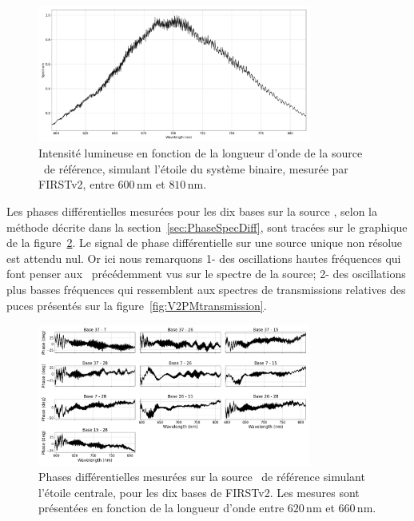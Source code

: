 \begin{figure}[ht!]
    \centering
    \includegraphics[width=0.8\textwidth]{Figure_Chap4/20221010_Bin01_Spectra_superK_Pola1_LaTex.png}
    \caption[Intensité lumineuse en fonction de la longueur d'onde de la source de référence (\sk) mesurée par FIRSTv2.]{Intensité lumineuse en fonction de la longueur d'onde de la source \sk~de référence, simulant l'étoile du système binaire, mesurée par FIRSTv2, entre $600 \,$nm et $810 \,$nm.}
    \label{fig:SuperKSpectrum}
\end{figure}

Les phases différentielles mesurées pour les dix bases sur la source \sk, selon la méthode décrite dans la section~\ref{sec:PhaseSpecDiff}, sont tracées sur le graphique de la figure~\ref{fig:PhaseDiffSuperK}. Le signal de phase différentielle sur une source unique non résolue est attendu nul. Or ici nous remarquons 1- des oscillations hautes fréquences qui font penser aux \wiggles~précédemment vus sur le spectre de la source; 2- des oscillations plus basses fréquences qui ressemblent aux spectres de transmissions relatives des puces présentés sur la figure~\ref{fig:V2PMtransmission}.

\begin{figure}[ht!]
    \centering
    \includegraphics[width=0.8\textwidth]{Figure_Chap4/20221010_SpeDiffPhase_BaseSubplot_Pola1_LaTex.png}
    \caption[Phases différentielles mesurées sur la source \sk~de référence simulant l'étoile centrale.]{Phases différentielles mesurées sur la source \sk~de référence simulant l'étoile centrale, pour les dix bases de FIRSTv2. Les mesures sont présentées en fonction de la longueur d'onde entre $620 \,$nm et $660 \,$nm.}
    \label{fig:PhaseDiffSuperK}
\end{figure}

